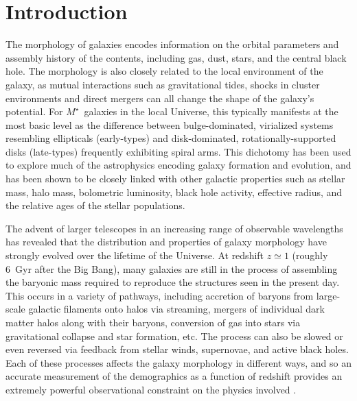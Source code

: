 \documentclass[twocolumn]{aastex6}
\begin{document}

\section{Introduction} \label{sec:intro}

The morphology of galaxies encodes information on the orbital parameters and assembly history of the contents, including gas, dust, stars, and the central black hole. The morphology is also closely related to the local environment of the galaxy, as mutual interactions such as gravitational tides, shocks in cluster environments and direct mergers can all change the shape of the galaxy's potential. For $M^\star$~galaxies in the local Universe, this typically manifests at the most basic level as the difference between bulge-dominated, virialized systems resembling ellipticals (early-types) and disk-dominated, rotationally-supported disks (late-types) frequently exhibiting spiral arms. This dichotomy has been used to explore much of the astrophysics encoding galaxy formation and evolution, and has been shown to be closely linked with other galactic properties such as stellar mass, halo mass, bolometric luminosity, black hole activity, effective radius, and the relative ages of the stellar populations. 

The advent of larger telescopes in an increasing range of observable wavelengths has revealed that the distribution and properties of galaxy morphology have strongly evolved over the lifetime of the Universe. At redshift $z\simeq1$ (roughly 6~Gyr after the Big Bang), many galaxies are still in the process of assembling the baryonic mass required to reproduce the structures seen in the present day. This occurs in a variety of pathways, including accretion of baryons from large-scale galactic filaments onto halos via streaming, mergers of individual dark matter halos along with their baryons, conversion of gas into stars via gravitational collapse and star formation, etc. The process can also be slowed or even reversed via feedback from stellar winds, supernovae, and active black holes. Each of these processes affects the galaxy morphology in different ways, and so an accurate measurement of the demographics as a function of redshift provides an extremely powerful observational constraint on the physics involved \citep[for a recent review see][]{con14}. 
\end{document}
